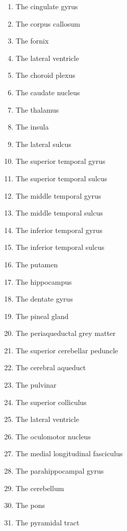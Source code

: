 \documentclass[]{book}
\providecommand{\tightlist}{%
  \setlength{\itemsep}{0pt}\setlength{\parskip}{0pt}}
\begin{document}
\begin{enumerate}
\def\labelenumi{\arabic{enumi}.}
\tightlist
\item
  The cingulate gyrus
\item
  The corpus callosum
\item
  The fornix
\item
  The lateral ventricle
\item
  The choroid plexus
\item
  The caudate nucleus
\item
  The thalamus
\item
  The insula
\item
  The lateral sulcus
\item
  The superior temporal gyrus
\item
  The superior temporal sulcus
\item
  The middle temporal gyrus
\item
  The middle temporal sulcus
\item
  The inferior temporal gyrus
\item
  The inferior temporal sulcus
\item
  The putamen
\item
  The hippocampus
\item
  The dentate gyrus
\item
  The pineal gland
\item
  The periaqueductal grey matter
\item
  The superior cerebellar peduncle
\item
  The cerebral aqueduct
\item
  The pulvinar
\item
  The superior colliculus
\item
  The lateral ventricle
\item
  The oculomotor nucleus
\item
  The medial longitudinal fasciculus
\item
  The parahippocampal gyrus
\item
  The cerebellum
\item
  The pons
\item
  The pyramidal tract
\end{enumerate}
\end{document}
